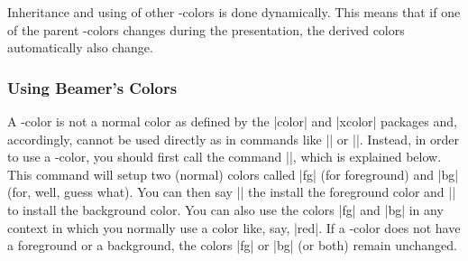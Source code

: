 Inheritance and using of other \beamer-colors is done
dynamically. This means that if one of the parent \beamer-colors
changes during the presentation, the derived colors automatically also
change.


\subsubsection{Using Beamer's Colors}

A \beamer-color is not a normal color as defined by the |color| and
|xcolor| packages and, accordingly, cannot be used directly as in
commands like |\color| or ||. Instead, in order to use a
\beamer-color, you should first call the command |\usebeamercolor|,
which is explained below. This command will setup two (normal) colors
called |fg| (for foreground) and |bg| (for, well, guess what). You can
then say |\color{fg}| the install the foreground color and
|\color{bg}| to install the background color. You can also use the
colors |fg| and |bg| in any context in which you normally use a color
like, say, |red|. If a \beamer-color does not have a foreground or a
background, the colors |fg| or |bg| (or both) remain unchanged. 

